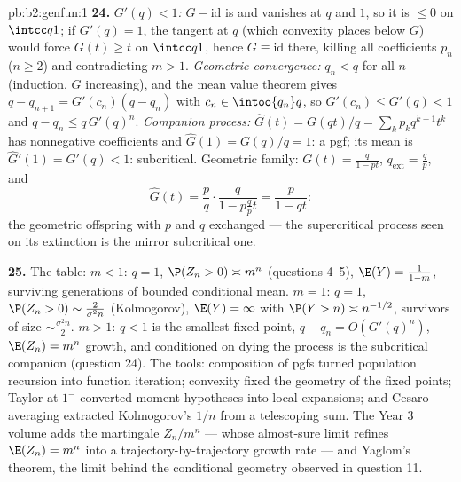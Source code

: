 \begin{solution}{pb:b2:genfun:1}
\textbf{24.} \emph{$G'(q) < 1$:} $G - \mathrm{id}$ is 
and vanishes at $q$ and $1$, so it is $\leq 0$ on $\intcc
q1$; if $G'(q) = 1$, the tangent at $q$ (which convexity
places below $G$) would force $G(t) \geq t$ on $\intcc q1$,
hence $G \equiv \mathrm{id}$ there, killing all coefficients
$p_n$ ($n \geq 2$) and contradicting $m > 1$. \emph{Geometric
convergence:} $q_n < q$ for all $n$ (induction, $G$
increasing), and the mean value theorem gives $q - q_{n+1} =
G'(c_n)(q - q_n)$ with $c_n \in \intoo{q_n}q$, so $G'(c_n)
\leq G'(q) < 1$ and $q - q_n \leq q\,G'(q)^n$.
\emph{Companion process:} $\widehat G(t) = G(qt)/q =
\sum_kp_kq^{k-1}t^k$ has nonnegative coefficients and
$\widehat G(1) = G(q)/q = 1$: a pgf; its mean is $\widehat
G'(1) = G'(q) < 1$: subcritical. Geometric family: $G(t) =
\frac{q}{1-pt}$, $q_{\mathrm{ext}} = \frac qp$, and
\[
\widehat G(t) = \frac pq\cdot\frac{q}{1 - p\frac qp t}
= \frac{p}{1 - qt} :
\]
the geometric offspring  with $p$ and $q$ exchanged ---
the supercritical process seen on its extinction  is the
mirror subcritical one.

\textbf{25.} The table: $m < 1$: $q = 1$, $\P(Z_n > 0)
\asymp m^n$ (questions 4--5), $\E(Y) = \frac1{1-m}$,
surviving generations of bounded conditional mean. $m = 1$:
$q = 1$, $\P(Z_n > 0) \sim \frac2{\sigma^2n}$ (Kolmogorov),
$\E(Y) = \infty$ with $\P(Y > n) \asymp n^{-1/2}$, survivors
of size $\sim \frac{\sigma^2n}2$. $m > 1$: $q < 1$ is the
smallest fixed point, $q - q_n = O(G'(q)^n)$, $\E(Z_n) = m^n$
growth, and conditioned on dying the process is the
subcritical companion (question 24). The tools: composition
of pgfs turned population recursion into function iteration;
convexity fixed the geometry of the fixed points; Taylor at
$1^-$ converted moment hypotheses into local expansions; and
Cesaro averaging extracted Kolmogorov's $1/n$ from a
telescoping sum. The Year 3 volume adds the martingale $Z_n/
m^n$ --- whose almost-sure limit refines $\E(Z_n) = m^n$ into
a trajectory-by-trajectory growth rate --- and Yaglom's
theorem, the limit  behind the conditional geometry
observed in question 11.
\end{solution}
